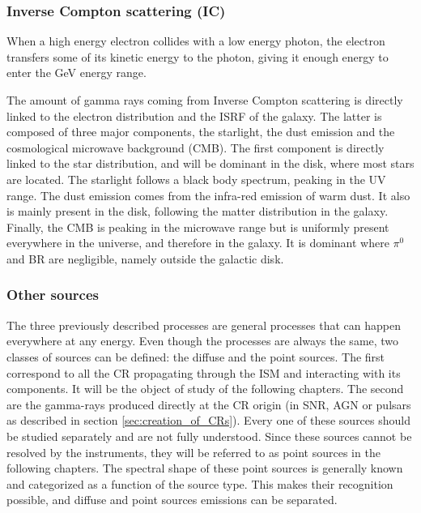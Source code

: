 

\subsubsection{Inverse Compton scattering (IC)}


When a high energy electron collides with a low energy photon, the electron transfers some of its kinetic energy to the photon, giving it enough energy to enter the GeV energy range.

The amount of gamma rays coming from Inverse Compton scattering is directly linked to the electron distribution and the ISRF of the galaxy. The latter is composed of three major components, the starlight, the dust emission and the cosmological microwave background (CMB). The first component is directly linked to the star distribution, and will be dominant in the disk, where most stars are located. The starlight follows a black body spectrum, peaking in the UV range. The dust emission comes from the infra-red emission of warm dust. It also is mainly present in the disk, following the matter distribution in the galaxy. Finally, the CMB is peaking in the microwave range but is uniformly present everywhere in the universe, and therefore in the galaxy. It is dominant where $\pi^{0}$ and BR are negligible, namely outside the galactic disk.



\subsubsection{Other sources}

The three previously described processes are general processes that can happen everywhere at any energy. Even though the processes are always the same, two classes of sources can be defined: the diffuse and the point sources.
The first correspond to all the CR propagating through the ISM and interacting with its components. It will be the object of study of the following chapters. 
The second are the gamma-rays produced directly at the CR origin (in SNR, AGN or pulsars as described in section \ref{sec:creation_of_CRs}). Every one of these sources should be studied separately and are not fully understood. Since these sources cannot be resolved by the instruments, they will be referred to as point sources in the following chapters. The spectral shape of these point sources is generally known and categorized as a function of the source type. This makes their recognition possible, and diffuse and point sources emissions can be separated.


